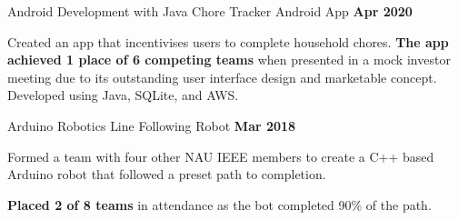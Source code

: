 \begin{cventries}
    \cventry
    {Android Development with Java} %
    {Chore Tracker Android App} %
    {\textbf{Apr 2020}}%
    {} %
    {
      \begin{cvitems} %
        \item {Created an app that incentivises users to complete household chores. \textbf{The app achieved 1 place of 6 competing teams} when presented in a mock investor meeting due to its outstanding user interface design and marketable concept. Developed using Java, SQLite, and AWS.}
      \end{cvitems}
     }
 \cventry
    {Arduino Robotics} %
    {Line Following Robot} %
    {\textbf{Mar 2018}}%
    {} %
    {
      \begin{cvitems} %
        \item {Formed a team with four other NAU IEEE members to create a C++ based Arduino robot that followed a preset path to completion.}
        \item{\textbf{Placed 2 of 8 teams} in attendance as the bot completed 90\% of the path.}
      \end{cvitems}
     }
\end{cventries}
